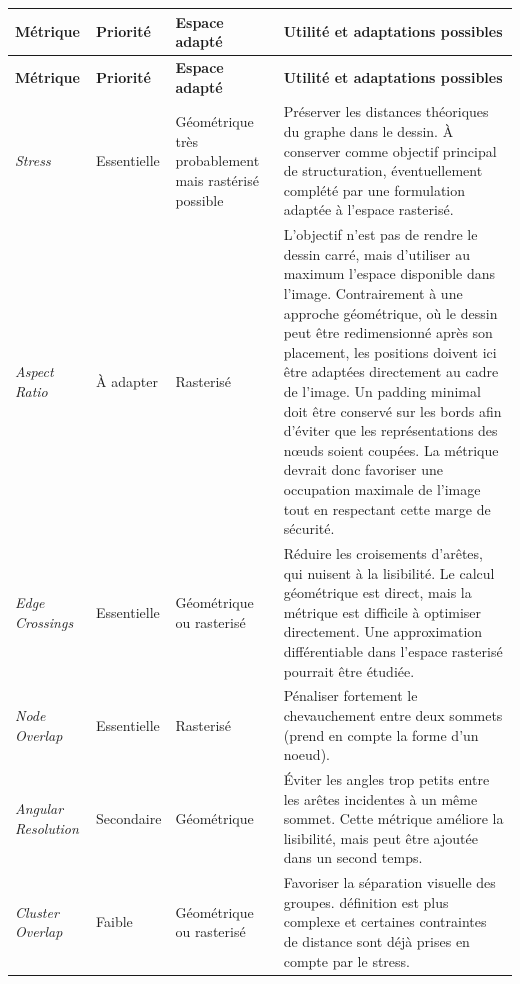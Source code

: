 \documentclass[a4paper,11pt]{article}
\begin{document}
\small
\renewcommand{\arraystretch}{1.5}
\begin{longtable}{|p{2.5cm}|p{2.3cm}|p{2.7cm}|p{6.5cm}|}
\hline
\textbf{Métrique} &
\textbf{Priorité} &
\textbf{Espace adapté} &
\textbf{Utilité et adaptations possibles} \\
\hline
\endfirsthead

\hline
\textbf{Métrique} &
\textbf{Priorité} &
\textbf{Espace adapté} &
\textbf{Utilité et adaptations possibles} \\
\hline
\endhead

\textit{Stress} &
Essentielle &
Géométrique très probablement mais rastérisé possible &
Préserver les distances théoriques du graphe dans le dessin. À conserver comme objectif principal de structuration, éventuellement complété par une formulation adaptée à l'espace rasterisé. \\
\hline

\textit{Aspect Ratio} &
À adapter &
Rasterisé &
L'objectif n'est pas de rendre le dessin carré, mais d'utiliser au maximum l'espace disponible dans l'image. Contrairement à une approche géométrique, où le dessin peut être redimensionné après son placement, les positions doivent ici être adaptées directement au cadre de l'image. Un padding minimal doit être conservé sur les bords afin d'éviter que les représentations des nœuds soient coupées. La métrique devrait donc favoriser une occupation maximale de l'image tout en respectant cette marge de sécurité. \\
\hline

\textit{Edge Crossings} &
Essentielle &
Géométrique ou rasterisé &
Réduire les croisements d'arêtes, qui nuisent à la lisibilité. Le calcul géométrique est direct, mais la métrique est difficile à optimiser directement. Une approximation différentiable dans l'espace rasterisé pourrait être étudiée. \\
\hline

\textit{Node Overlap} &
Essentielle &
Rasterisé &
Pénaliser fortement le chevauchement entre deux sommets (prend en compte la forme d'un noeud). \\
\hline

\textit{Angular Resolution} &
Secondaire &
Géométrique &
Éviter les angles trop petits entre les arêtes incidentes à un même sommet. Cette métrique améliore la lisibilité, mais peut être ajoutée dans un second temps. \\
\hline

\textit{Cluster Overlap} &
Faible &
Géométrique ou rasterisé &
Favoriser la séparation visuelle des groupes. définition est plus complexe et certaines contraintes de distance sont déjà prises en compte par le stress. \\
\hline


\end{longtable}
\end{document}

